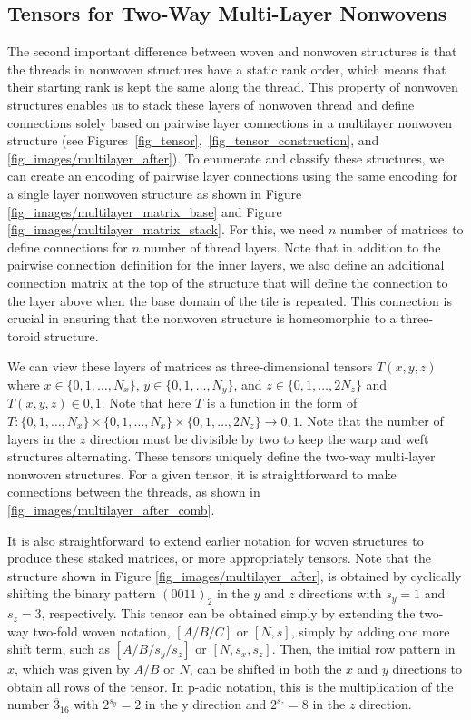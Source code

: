 \documentclass[times,twocolumn,final]{elsarticle}
\begin{document}
\subsection{Tensors for Two-Way Multi-Layer Nonwovens}

The second important difference between woven and nonwoven structures is that the threads in nonwoven structures have a static rank order, which means that their starting rank is kept the same along the thread. This property of nonwoven structures enables us to stack these layers of nonwoven thread and define connections solely based on pairwise layer connections in a multilayer nonwoven structure (see Figures~\ref{fig_tensor},~\ref{fig_tensor_construction}, and~  \ref{fig_images/multilayer_after}). To enumerate and classify these structures, we can create an encoding of pairwise layer connections using the same encoding for a single layer nonwoven structure as shown in Figure \ref{fig_images/multilayer_matrix_base} and Figure \ref{fig_images/multilayer_matrix_stack}. For this, we need $n$ number of matrices to define connections for $n$ number of thread layers. Note that in addition to the pairwise connection definition for the inner layers, we also define an additional connection matrix at the top of the structure that will define the connection to the layer above when the base domain of the tile is repeated. This connection is crucial in ensuring that the nonwoven structure is homeomorphic to a three-toroid structure. 

We can view these layers of matrices as three-dimensional tensors $T(x,y,z)$ where $x \in \{0,1,\ldots,N_x\}$, $y \in \{0,1,\ldots,N_y\}$, and $z \in \{0,1,\ldots,2N_z\}$ and $T(x,y,z) \in {0,1}$. Note that here $T$ is a function in the form of $T: \{0,1,\ldots,N_x\} \times \{0,1,\ldots,N_x\} \times \{0,1,\ldots,2N_z\} \longrightarrow {0,1}$. Note that the number of layers in the $z$ direction must be divisible by two to keep the warp and weft structures alternating.  These tensors uniquely define the two-way multi-layer nonwoven structures. For a given tensor,  it is straightforward to make connections between the threads, as shown in \ref{fig_images/multilayer_after_comb}.


It is also straightforward to extend earlier notation for woven structures to produce these staked matrices, or more appropriately tensors. Note that the structure shown in Figure \ref{fig_images/multilayer_after}, is obtained by cyclically shifting the binary pattern $(0011)_2$ in the $y$ and $z$ directions with $s_y=1$ and $s_z=3$, respectively. 
This tensor can be obtained simply by extending the two-way two-fold woven notation, $[A/B/C]$ or $[N,s]$, simply by adding one more shift term, such as $[A/B/s_y/s_z]$ or $[N,s_x,s_z]$. Then, the initial row pattern in $x$, which was given by $A/B$ or $N$, can be shifted in both the $x$ and $y$ directions to obtain all rows of the tensor. In p-adic notation, this is the multiplication of the number $\overline{3}_{16}$
with $2^{s_y}=2$ in the y direction and $2^{s_z}=8$ in the $z$ direction. 
\end{document}

